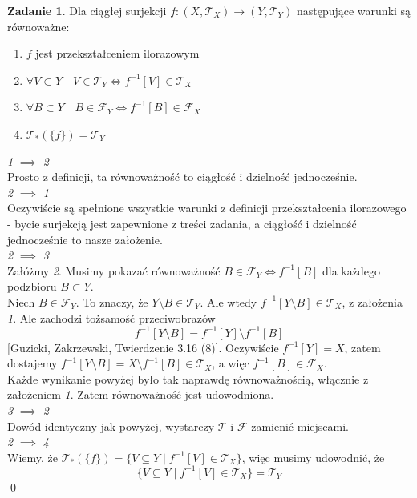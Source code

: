 \documentclass{article}
\theoremstyle{definition}%
\theoremstyle{theorem}
\newtheorem{zad}{Zadanie}
\renewenvironment{proof}{{\bfseries Rozwiązanie \\}}{\qed}
\newcommand{\sT}{\mathcal{T}} %
\newcommand{\sF}{\mathcal{F}} %
\begin{document}
	\begin{zad}\label{equiv_quotient_maps}
		Dla ciągłej surjekcji $f:(X,\sT_X)\to(Y,\sT_Y)$ następujące warunki są równoważne:
		\begin{enumerate}
			\item $f$ jest przekształceniem ilorazowym
			\item 	$\forall V\subset Y \quad V \in \sT_Y \Longleftrightarrow f^{-1}[V] \in \sT_X$
			\item $\forall B\subset Y \quad B \in \sF_Y \Longleftrightarrow f^{-1}[B] \in \sF_X$ 
			\item $\sT_*(\{f\})=\sT_Y$
		\end{enumerate}
		
	\end{zad}
	\begin{proof} 
		\emph{1} $\implies$ \emph{2} \\
		Prosto z definicji, ta równoważność to ciągłość i dzielność jednocześnie. \\
		\emph{2} $\implies$ \emph{1} \\
		Oczywiście są spełnione wszystkie warunki z definicji przekształcenia ilorazowego - bycie surjekcją jest zapewnione z treści zadania, a ciągłość i dzielność jednocześnie to nasze założenie.
		\\
		\emph{2} $\implies$ \emph{3} \\
		Załóżmy \emph{2}. Musimy pokazać równoważność $B \in \sF_Y \Leftrightarrow f^{-1}[B]$ dla każdego podzbioru $B\subset Y$. \\
		 Niech $B\in \sF_Y$. To znaczy, że $Y\setminus B \in \sT_Y$. Ale wtedy $f^{-1}[Y\setminus B] \in \sT_X$, z założenia \emph{1}. Ale zachodzi tożsamość przeciwobrazów \[f^{-1}[Y\setminus B] = f^{-1}[Y]\setminus f^{-1}[B]\] [Guzicki, Zakrzewski, Twierdzenie 3.16 (8)]. Oczywiście $f^{-1}[Y] = X$, zatem dostajemy $f^{-1}[Y\setminus B] = X \setminus f^{-1}[B] \in \sT_X$, a więc $f^{-1}[B] \in \sF_X$.
		 \\
		Każde wynikanie powyżej było tak naprawdę równoważnością, włącznie z założeniem \emph{1}. Zatem równoważność jest udowodniona.
		\\
		\emph{3} $\implies$ \emph{2}
		\\
	Dowód identyczny jak powyżej, wystarczy $\sT$ i $\sF$ zamienić miejscami.
	\\
	\emph{2} $\implies$ \emph{4}
	\\
	Wiemy, że $\sT_*(\{f\})=\{V\subseteq Y \mid f^{-1}[V]\in \sT_X \} $, więc musimy udowodnić, że \[
	\{V \subseteq Y \mid f^{-1}[V] \in \sT_X \} = \sT_Y
\]
\end{proof}
\end{document}
